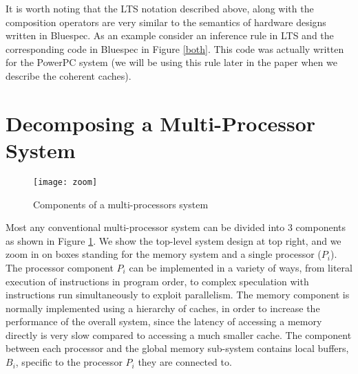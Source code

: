 %
%
%
%
It is worth noting that the LTS notation described above, along with the
composition operators are very similar to the semantics of hardware designs
written in Bluespec. As an example consider an inference rule in LTS and the
corresponding code in Bluespec in Figure \ref{both}. This code was actually
written for the PowerPC system \cite{Khan:PowerPc} (we will be using this rule
later in the paper when we describe the coherent caches).

\section{Decomposing a Multi-Processor System}
\label{sec:store-atomicity}

\begin{figure}
\centering
\texttt{[image: zoom]}
\caption{Components of a multi-processors system}
\label{zoom}
\end{figure}

Most any conventional multi-processor system can be divided into 3 components as shown in
Figure \ref{zoom}. 
We show the top-level system design at top right, and we zoom in on boxes standing for the
memory system and a single processor ($P_i$).
The processor component $P_i$ can be implemented in a
variety of ways, from literal execution of instructions in program order, to complex speculation
with instructions run simultaneously to exploit parallelism. The memory component is normally implemented
using a hierarchy of caches, in order to increase the performance of the
overall system, since the latency of accessing a memory directly is very slow
compared to accessing a much smaller cache. The component between each
processor and the global memory sub-system contains local buffers, $B_i$, specific to
the processor $P_i$ they are connected to. 

